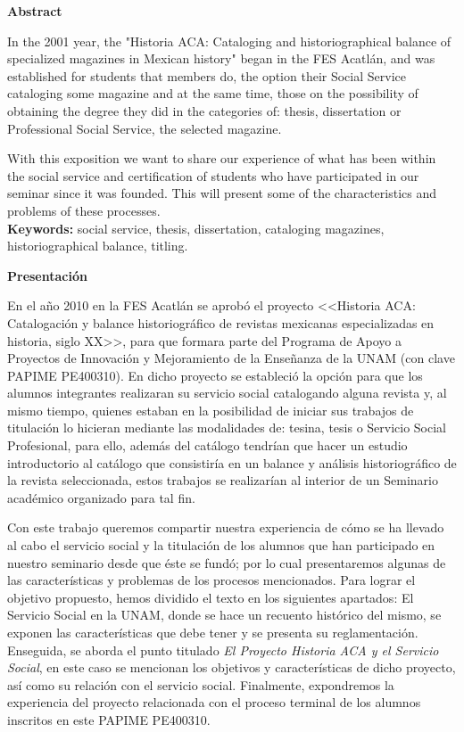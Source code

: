 \medskip
\textbf{Abstract}

In the 2001 year, the "Historia ACA: Cataloging and historiographical 
balance of specialized magazines in Mexican history" began in the FES 
Acatlán, and was established for students that members do, the option 
their Social Service cataloging some magazine and at the same time, 
those on the possibility of obtaining the degree they did in the 
categories of: thesis, dissertation or Professional Social Service, the 
selected magazine.

With this exposition we want to share our experience of what has
been within the social service and certification of students who have
participated in our seminar since it was founded. This will present some of
the characteristics and problems of these processes.\\
\textbf{Keywords:} social service, thesis, dissertation, cataloging
magazines, historiographical balance, titling.


\bigskip
\textbf{Presentación}

En el año  2010 en la FES Acatlán se aprobó el proyecto <<Historia ACA:
Catalogación y balance historiográfico de revistas mexicanas especializadas
en historia, siglo XX>>, para que formara parte del Programa de Apoyo a
Proyectos de Innovación y Mejoramiento de la Enseñanza de la UNAM (con
clave PAPIME PE400310).  En dicho proyecto se estableció la opción para que
los alumnos integrantes realizaran su servicio social catalogando alguna
revista y, al mismo tiempo, quienes estaban en la posibilidad de iniciar
sus trabajos de titulación lo hicieran mediante las modalidades de: tesina,
tesis o Servicio Social Profesional, para ello, además del catálogo
tendrían que hacer un estudio introductorio al catálogo que consistiría en
un balance y análisis historiográfico  de la revista seleccionada, estos
trabajos se realizarían al interior de un Seminario académico organizado
para tal fin. 

Con este trabajo queremos compartir nuestra experiencia de cómo se ha
llevado al cabo el servicio social y la titulación de los alumnos que han
participado en nuestro seminario desde que éste se fundó; por lo cual
presentaremos algunas de las características y problemas de los procesos
mencionados. Para lograr el objetivo propuesto, hemos dividido  el texto en
los siguientes apartados: El Servicio Social en la UNAM, donde se hace un
recuento histórico del mismo, se exponen las características que debe
tener y se presenta su reglamentación. Enseguida, se aborda el punto
titulado \textit{El Proyecto Historia ACA y el Servicio Social}, en este caso se
mencionan los objetivos y características de dicho proyecto, así como su
relación con el servicio social. Finalmente, expondremos la experiencia del
proyecto relacionada con el proceso terminal de los alumnos inscritos en
este PAPIME PE400310.


